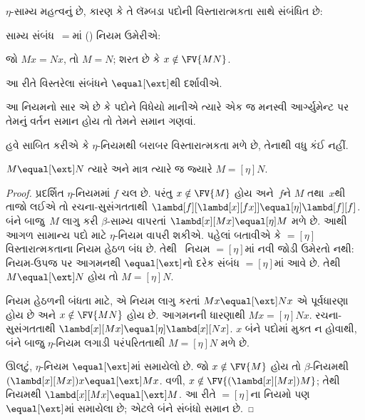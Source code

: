 $\eta$-સામ્ય મહત્વનું છે, કારણ કે તે લૅમ્બડા પદોની
વિસ્તારાત્મકતા સાથે સંબંધિત છે:

\begin{defn}[વિસ્તારાત્મકતા]
  સામ્ય સંબંધ~$\equal$માં (\ext) નિયમ ઉમેરીએ:
  \begin{center}
  જો $Mx \equal Nx$, તો $M \equal N$; શરત છે કે $x \notin \FV{MN}$.
  \end{center}
  આ રીતે વિસ્તરેલા સંબંધને $\equal[\ext]$થી દર્શાવીએ.
\end{defn}

આ નિયમનો સાર એ છે કે પદોને વિધેયો માનીએ ત્યારે એક જ
મનસ્વી આર્ગ્યુમેન્ટ પર તેમનું વર્તન સમાન હોય તો તેમને
સમાન ગણવાં.

હવે સાબિત કરીએ કે $\eta$-નિયમથી બરાબર વિસ્તારાત્મકતા
મળે છે, તેનાથી વધુ કંઈ નહીં.

\begin{thm}
  $M \equal[\ext] N$ ત્યારે અને માત્ર ત્યારે જ જ્યારે
  $M \equal[\eta] N$.
\end{thm}

\begin{proof}
  પ્રદર્શિત $\eta$-નિયમમાં $f$ ચલ છે. પરંતુ
  $x \notin \FV{M}$ હોય અને~$f$ને $M$ તથા~$x$થી
  તાજો લઈએ તો રચના-સુસંગતતાથી
  $\lambd[f][\lambd[x][f x]] \equal[\eta]
  \lambd[f][f]$. બંને બાજુ~$M$ લાગુ કરી
  $\beta$-સામ્ય વાપરતાં $\lambd[x][Mx]
  \equal[\eta] M$ મળે છે. આથી આગળ સામાન્ય પદો માટે
  $\eta$-નિયમ વાપરી શકીએ.
  પહેલાં બતાવીએ કે $\equal[\eta]$ વિસ્તારાત્મકતાના
  નિયમ હેઠળ બંધ છે. તેથી~\ext{} નિયમ
  $\equal[\eta]$માં નવી જોડી ઉમેરતો નથી: નિયમ-ઉપજ
  પર આગમનથી $\equal[\ext]$નો દરેક સંબંધ
  $\equal[\eta]$માં આવે છે. તેથી
  $M \equal[\ext] N$ હોય તો $M \equal[\eta] N$.

  \ext{} નિયમ હેઠળની બંધતા માટે, એ નિયમ લાગુ કરતાં
  $Mx \equal[\ext] Nx$ એ પૂર્વધારણા હોય છે અને
  $x \notin \FV{MN}$ હોય છે. આગમનની ધારણાથી
  $Mx \equal[\eta] Nx$. રચના-સુસંગતતાથી
  $\lambd[x][Mx] \equal[\eta] \lambd[x][Nx]$.
  $x$ બંને પદોમાં મુક્ત ન હોવાથી, બંને બાજુ
  $\eta$-નિયમ લગાડી પરંપરિતતાથી
  $M \equal[\eta] N$ મળે છે.

  ઊલટું, $\eta$-નિયમ $\equal[\ext]$માં સમાયેલો છે.
  જો $x \notin \FV{M}$ હોય તો $\beta$-નિયમથી
  $(\lambd[x][Mx])x \equal[\ext] Mx$. વળી,
  $x \notin \FV{(\lambd[x][Mx])M}$; તેથી
  \ext{} નિયમથી $\lambd[x][Mx] \equal[\ext] M$.
  આ રીતે
  $\equal[\eta]$ના નિયમો પણ $\equal[\ext]$માં
  સમાયેલા છે; એટલે બંને સંબંધો સમાન છે.
\end{proof}
\endgroup


